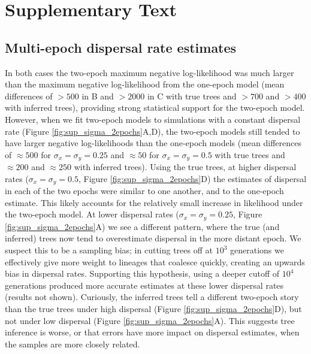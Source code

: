 \documentclass[12pt]{article}
\begin{document}


\newpage
\section*{Supplementary Text}
\label{sec:appendix}

\subsection*{Multi-epoch dispersal rate estimates}

In both cases the two-epoch maximum negative log-likelihood was much larger than the maximum negative log-likelihood from the one-epoch model (mean differences of $>500$ in B and $>2000$ in C with true trees and $>700$ and $>400$ with inferred trees), providing strong statistical support for the two-epoch model.
However, when we fit two-epoch models to simulations with a constant dispersal rate (Figure \ref{fig:sup_sigma_2epochs}A,D), the two-epoch models still tended to have larger negative log-likelihoods than the one-epoch models (mean differences of $\approx500$ for $\sigma_x=\sigma_y=0.25$ and $\approx50$ for $\sigma_x=\sigma_y=0.5$ with true trees and $\approx200$ and $\approx250$ with inferred trees).
Using the true trees, at higher dispersal rates ($\sigma_x=\sigma_y=0.5$, Figure \ref{fig:sup_sigma_2epochs}D) the estimates of dispersal in each of the two epochs were similar to one another, and to the one-epoch estimate.
This likely accounts for the relatively small increase in likelihood under the two-epoch model.
At lower dispersal rates ($\sigma_x=\sigma_y=0.25$, Figure \ref{fig:sup_sigma_2epochs}A) we see a different pattern, where the true (and inferred) trees now tend to overestimate dispersal in the more distant epoch. 
We suspect this to be a sampling bias; in cutting trees off at $10^3$ generations we effectively give more weight to lineages that coalesce quickly, creating an upwards bias in dispersal rates.
Supporting this hypothesis, using a deeper cutoff of $10^4$ generations produced more accurate estimates at these lower dispersal rates (results not shown).
Curiously, the inferred trees tell a different two-epoch story than the true trees under high dispersal (Figure \ref{fig:sup_sigma_2epochs}D), but not under low dispersal (Figure \ref{fig:sup_sigma_2epochs}A). 
This suggests tree inference is worse, or that errors have more impact on dispersal estimates, when the samples are more closely related. 
\end{document}
